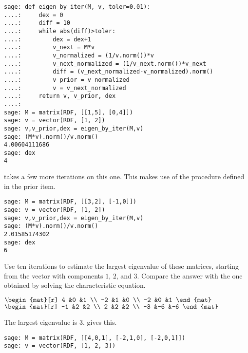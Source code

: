 \begin{exercises}
\begin{answer}
\begin{exparts}
\begin{lstlisting}
sage: def eigen_by_iter(M, v, toler=0.01):
....:     dex = 0
....:     diff = 10
....:     while abs(diff)>toler:
....:         dex = dex+1
....:         v_next = M*v
....:         v_normalized = (1/v.norm())*v
....:         v_next_normalized = (1/v_next.norm())*v_next
....:         diff = (v_next_normalized-v_normalized).norm()
....:         v_prior = v_normalized
....:         v = v_next_normalized
....:     return v, v_prior, dex
....: 
sage: M = matrix(RDF, [[1,5], [0,4]])
sage: v = vector(RDF, [1, 2])
sage: v,v_prior,dex = eigen_by_iter(M,v)
sage: (M*v).norm()/v.norm()
4.00604111686
sage: dex
4           
 \end{lstlisting}
      \partsitem \Sage{} takes a few more iterations on this one.
        This makes use of the procedure defined in the prior item.
\begin{lstlisting}
sage: M = matrix(RDF, [[3,2], [-1,0]])
sage: v = vector(RDF, [1, 2])
sage: v,v_prior,dex = eigen_by_iter(M,v)
sage: (M*v).norm()/v.norm()
2.01585174302
sage: dex
6        
\end{lstlisting}
       \end{exparts}
     \end{answer}
  \item 
    Use ten iterations to estimate the largest eigenvalue of these
    matrices, starting from the vector with components $1$, $2$, and $3$.
    Compare the answer with the one obtained by solving the characteristic
    equation.
    \begin{exparts*}
      \partsitem $\begin{mat}[r]
                    4   &0  &1 \\
                    -2  &1  &0  \\
                    -2  &0  &1
                  \end{mat}$
      \partsitem $\begin{mat}[r]
                   -1  &2  &2  \\
                    2  &2  &2  \\
                   -3  &-6 &-6
                  \end{mat}$
    \end{exparts*}
    \begin{answer}
     \begin{exparts}
       \partsitem The largest eigenvalue is $3$.
         \Sage{} gives this.
\begin{lstlisting}
sage: M = matrix(RDF, [[4,0,1], [-2,1,0], [-2,0,1]])
sage: v = vector(RDF, [1, 2, 3])

\end{lstlisting}
\end{exparts}
\end{answer}
\end{exercises}
